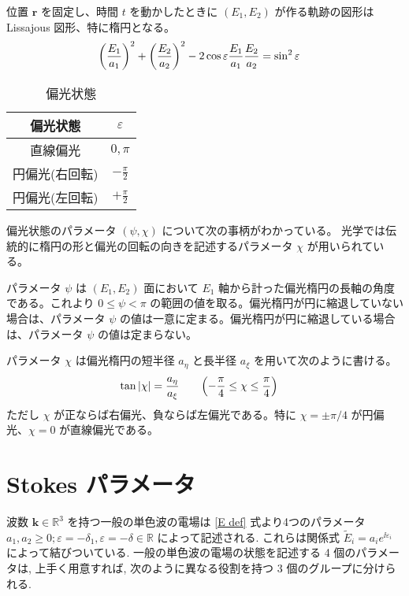 \documentclass[uplatex,dvipdfmx,a4paper,11pt]{jlreq}
\newcommand{\RR}{\mathbb{R}}
\newcommand{\rr}{\bm{r}}
\newcommand{\kk}{\bm{k}}
\theoremstyle{definition}
\begin{document}
\begin{proposition}
  位置 $\rr$ を固定し、時間 $t$ を動かしたときに $(E_1, E_2)$ が作る軌跡の図形は Lissajous 図形、特に楕円となる。
  \begin{align}
    \qty(\frac{E_1}{a_1})^2 + \qty(\frac{E_2}{a_2})^2 - 2\cos\varepsilon\frac{E_1}{a_1}\frac{E_2}{a_2} & = \sin^2{\varepsilon}
  \end{align}
\end{proposition}

\begin{table}[hbtp]
  \centering
  \begin{tabular}{|c|c|}
    \hline
    偏光状態     & $\varepsilon$    \\
    \hline \hline
    直線偏光     & $0, \pi$         \\
    円偏光(右回転) & $-\frac{\pi}{2}$ \\
    円偏光(左回転) & $+\frac{\pi}{2}$ \\
    \hline
  \end{tabular}
  \caption{偏光状態}
\end{table}

\begin{definition}
  偏光状態のパラメータ $(\psi, \chi)$ について次の事柄がわかっている。
  光学では伝統的に楕円の形と偏光の回転の向きを記述するパラメータ $\chi$ が用いられている。

  パラメータ $\psi$ は $(E_1, E_2)$ 面において $E_1$ 軸から計った偏光楕円の長軸の角度である。これより $0 \leq \psi < \pi$ の範囲の値を取る。偏光楕円が円に縮退していない場合は、パラメータ $\psi$ の値は一意に定まる。偏光楕円が円に縮退している場合は、パラメータ $\psi$ の値は定まらない。

  パラメータ $\chi$ は偏光楕円の短半径 $a_\eta$ と長半径 $a_\xi$ を用いて次のように書ける。
  \begin{align}
    \tan|\chi| & = \frac{a_\eta}{a_\xi} \qquad \qty(-\frac{\pi}{4}\leq\chi\leq\frac{\pi}{4})
  \end{align}
  ただし $\chi$ が正ならば右偏光、負ならば左偏光である。特に $\chi = \pm \pi/4$ が円偏光、$\chi = 0$ が直線偏光である。
\end{definition}
\section{Stokes パラメータ}
波数 $\kk\in\RR^3$ を持つ一般の単色波の電場は \eqref{E def} 式より4つのパラメータ $a_1, a_2 \geq 0; \varepsilon = -\delta_1, \varepsilon = -\delta\in\RR$ によって記述される. これらは関係式 $\tilde{E}_i = a_ie^{\ii \varepsilon_i}$ によって結びついている. 一般の単色波の電場の状態を記述する 4 個のパラメータは, 上手く用意すれば, 次のように異なる役割を持つ 3 個のグループに分けられる.
\end{document}

